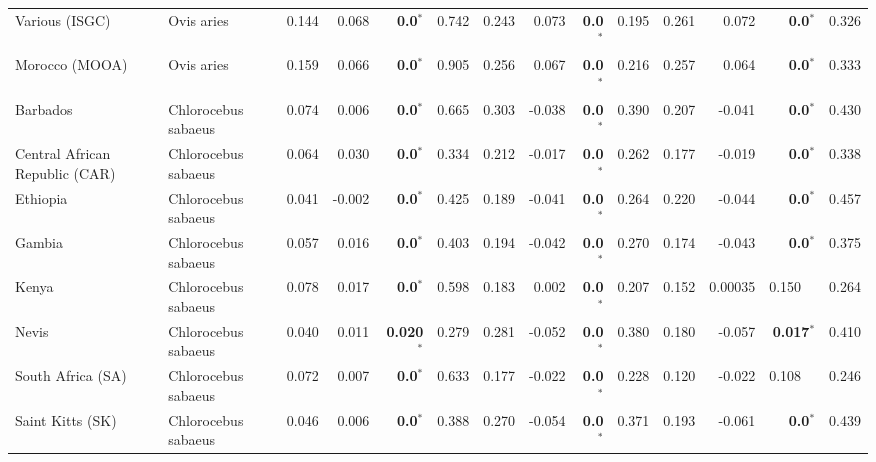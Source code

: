 \documentclass{article}
\begin{document}
\begin{table*}[!ht]
\begin{adjustbox}{width = 1\textwidth}
\begin{tabular}{||l|l||r|r|r|r||r|r|r|r||r|r|r|r||}
                Various (ISGC)                                      & Ovis aries          & 0.144 & 0.068   & \textbf{0.0}$\bm{^*}$   & 0.742 & 0.243  & 0.073  & \textbf{0.0}$\bm{^*}$ & 0.195 & 0.261 & 0.072 & \textbf{0.0}$\bm{^*}$ & 0.326 \\
                Morocco (MOOA)                                      & Ovis aries          & 0.159 & 0.066   & \textbf{0.0}$\bm{^*}$   & 0.905 & 0.256  & 0.067  & \textbf{0.0}$\bm{^*}$ & 0.216 & 0.257 & 0.064 & \textbf{0.0}$\bm{^*}$ & 0.333 \\
                \rowcolor{LIGHTGREY} Barbados                       & Chlorocebus sabaeus & 0.074 & 0.006   & \textbf{0.0}$\bm{^*}$   & 0.665 & 0.303  & -0.038 & \textbf{0.0}$\bm{^*}$ & 0.390 & 0.207 & -0.041 & \textbf{0.0}$\bm{^*}$ & 0.430 \\
                \rowcolor{LIGHTGREY} Central African Republic (CAR) & Chlorocebus sabaeus & 0.064 & 0.030   & \textbf{0.0}$\bm{^*}$   & 0.334 & 0.212  & -0.017 & \textbf{0.0}$\bm{^*}$ & 0.262 & 0.177 & -0.019 & \textbf{0.0}$\bm{^*}$ & 0.338 \\
                \rowcolor{LIGHTGREY} Ethiopia                       & Chlorocebus sabaeus & 0.041 & -0.002  & \textbf{0.0}$\bm{^*}$   & 0.425 & 0.189  & -0.041 & \textbf{0.0}$\bm{^*}$ & 0.264 & 0.220 & -0.044 & \textbf{0.0}$\bm{^*}$ & 0.457 \\
                \rowcolor{LIGHTGREY} Gambia                         & Chlorocebus sabaeus & 0.057 & 0.016   & \textbf{0.0}$\bm{^*}$   & 0.403 & 0.194 & -0.042 & \textbf{0.0}$\bm{^*}$ & 0.270 & 0.174 & -0.043 & \textbf{0.0}$\bm{^*}$ & 0.375 \\
                \rowcolor{LIGHTGREY} Kenya                          & Chlorocebus sabaeus & 0.078 & 0.017   & \textbf{0.0}$\bm{^*}$   & 0.598 & 0.183 & 0.002 & \textbf{0.0}$\bm{^*}$ & 0.207 & 0.152 & 0.00035 & 0.150~~ & 0.264 \\
                \rowcolor{LIGHTGREY} Nevis                          & Chlorocebus sabaeus & 0.040 & 0.011   & \textbf{0.020}$\bm{^*}$ & 0.279 & 0.281 & -0.052 & \textbf{0.0}$\bm{^*}$ & 0.380 & 0.180 & -0.057 & \textbf{0.017}$\bm{^*}$ & 0.410 \\
                \rowcolor{LIGHTGREY} South Africa (SA)              & Chlorocebus sabaeus & 0.072 & 0.007   & \textbf{0.0}$\bm{^*}$ & 0.633 & 0.177 & -0.022 & \textbf{0.0}$\bm{^*}$ & 0.228 & 0.120 & -0.022 & 0.108~~ & 0.246 \\
                \rowcolor{LIGHTGREY} Saint Kitts (SK)               & Chlorocebus sabaeus & 0.046 & 0.006   & \textbf{0.0}$\bm{^*}$   & 0.388 & 0.270 & -0.054 & \textbf{0.0}$\bm{^*}$ & 0.371 & 0.193 & -0.061 & \textbf{0.0}$\bm{^*}$ & 0.439 \\

\end{tabular}
\end{adjustbox}
\end{table*}
\end{document}
